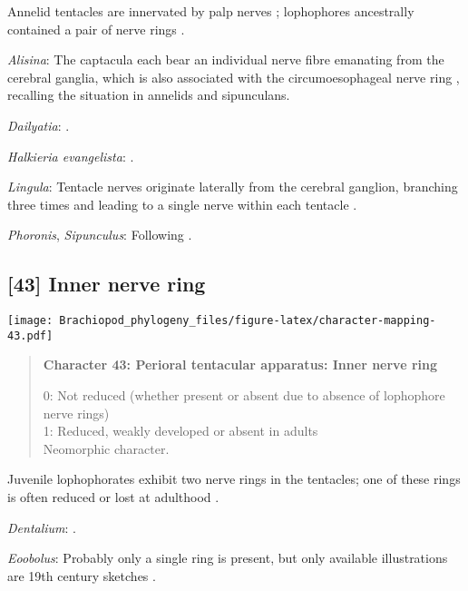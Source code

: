 \documentclass[openany]{book}
\theoremstyle{definition}
\theoremstyle{definition}
\theoremstyle{definition}
\theoremstyle{remark}
\begin{document}
Annelid tentacles are innervated by palp nerves \citep{Orrhage2005};
lophophores ancestrally contained a pair of nerve rings
\citep{Temereva2017Innervationof}.

\hypertarget{Alisina-coding-42}{}
\emph{Alisina}: The captacula each bear an individual nerve fibre
emanating from the cerebral ganglia, which is also associated with the
circumoesophageal nerve ring \citep{SumnerRooney2015}, recalling the
situation in annelids and sipunculans.

\hypertarget{Dailyatia-coding-42}{}
\emph{Dailyatia}: \citet{Orrhage2005}.

\hypertarget{Halkieria_evangelista-coding-42}{}
\emph{Halkieria evangelista}: \citet{Rice1993}.

\hypertarget{Lingula-coding-42}{}
\emph{Lingula}: Tentacle nerves originate laterally from the cerebral
ganglion, branching three times and leading to a single nerve within
each tentacle \citep{Fuchs2006}.

\hypertarget{Phoronis-coding-42}{}
\emph{Phoronis}, \emph{Sipunculus}: Following
\citet{Temereva2017Innervationof}.

\subsection*{{[}43{]} Inner nerve ring}\label{inner-nerve-ring}

\texttt{[image: Brachiopod\_phylogeny\_files/figure-latex/character-mapping-43.pdf]}

\begin{quote}
\textbf{Character 43: Perioral tentacular apparatus: Inner nerve ring}

0: Not reduced (whether present or absent due to absence of lophophore
nerve rings)\\
1: Reduced, weakly developed or absent in adults\\
Neomorphic character.
\end{quote}

Juvenile lophophorates exhibit two nerve rings in the tentacles; one of
these rings is often reduced or lost at adulthood
\citep{Temereva2017Innervationof}.

\hypertarget{Dentalium-coding-43}{}
\emph{Dentalium}: \citet{Temereva2017Thefirst}.

\hypertarget{Eoobolus-coding-43}{}
\emph{Eoobolus}: Probably only a single ring is present, but only
available illustrations are 19th century sketches \citep{Luter2016}.
\end{document}
